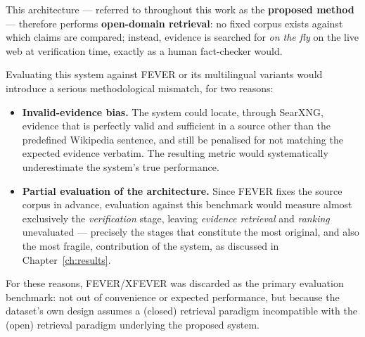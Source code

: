 This architecture --- referred to throughout this work as the
\textbf{proposed method} --- therefore performs
\textbf{open-domain retrieval}: no fixed corpus exists against which
claims are compared; instead, evidence is searched for \textit{on
the fly} on the live web at verification time, exactly as a human
fact-checker would.

Evaluating this system against FEVER or its multilingual variants
would introduce a serious methodological mismatch, for two reasons:

\begin{itemize}
    \item \textbf{Invalid-evidence bias.} The system could locate,
    through SearXNG, evidence that is perfectly valid and sufficient
    in a source other than the predefined Wikipedia sentence, and
    still be penalised for not matching the expected evidence
    verbatim. The resulting metric would systematically underestimate
    the system's true performance.
    \item \textbf{Partial evaluation of the architecture.} Since
    FEVER fixes the source corpus in advance, evaluation against this
    benchmark would measure almost exclusively the
    \textit{verification} stage, leaving \textit{evidence retrieval}
    and \textit{ranking} unevaluated --- precisely the stages that
    constitute the most original, and also the most fragile,
    contribution of the system, as discussed in
    Chapter~\ref{ch:results}.
\end{itemize}

For these reasons, FEVER/XFEVER was discarded as the primary
evaluation benchmark: not out of convenience or expected performance,
but because the dataset's own design assumes a (closed) retrieval
paradigm incompatible with the (open) retrieval paradigm underlying
the proposed system.
